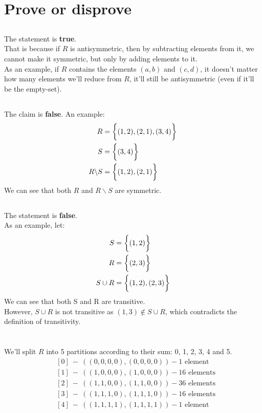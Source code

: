 \documentclass[a4paper, 12pt]{article}
\newcommand{\sub}[1]{\subsection{\underline{#1}}}
\newcommand{\eq}[1]{\begin{align*}#1\end{align*}}
\newcommand{\bigset}[1]{\bigg{\{} #1 \bigg{\}}}
\begin{document}
\begin{titlepage}
    
\end{titlepage}

\section{Prove or disprove}
\sub{}
The statement is \textbf{true}.\\
That is because if $R$ is antisymmetric, then by subtracting elements from it, we cannot make it symmetric, but only by adding elements to it.\\
As an example, if $R$ contains the elements $(a,b)$ and $(c,d)$, it doesn't matter how many elements we'll reduce from $R$, it'll still be antisymmetric (even if it'll be the empty-set).
\sub{}
The claim is \textbf{false}.
An example:
\eq{
    R&=\bigset{(1,2),(2,1),(3,4)}\\
    S&=\bigset{(3,4)}\\
    R\backslash{S}&=\bigset{(1,2),(2,1)}
}
We can see that both $R$ and $R\backslash{S}$ are symmetric.\\
\sub{}
The statement is \textbf{false}.\\
As an example, let:
\eq{
    S&=\bigset{(1,2)}\\
    R&=\bigset{(2,3)}\\
    S\cup{R}&=\bigset{(1,2),(2,3)}
}
We can see that both S and R are transitive.\\
However, $S\cup{R}$ is not transitive as $(1,3)\not\in{S\cup{R}}$, which contradicts the definition of transitivity.
\pagebreak

\section{}
We'll split $R$ into 5 partitions according to their sum: 0, 1, 2, 3, 4 and 5.
\eq{
    &[0]~-~((0,0,0,0),(0,0,0,0)) - \text{1 element}\\
    &[1]~-~((1,0,0,0),(1,0,0,0)) - \text{16 elements}\\
    &[2]~-~((1,1,0,0),(1,1,0,0)) - \text{36 elements}\\
    &[3]~-~((1,1,1,0),(1,1,1,0)) - \text{16 elements}\\
    &[4]~-~((1,1,1,1),(1,1,1,1)) - \text{1 element}
}

\end{document}
